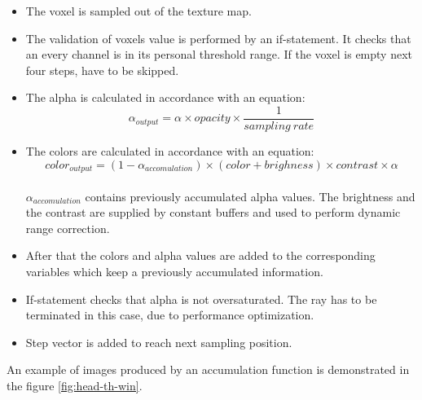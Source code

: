 \documentclass[twoside, english, 11pt]{report}
\begin{document}
\begin{itemize}
\item The voxel is sampled out of the texture map.
\item The validation of voxels value is performed by an if-statement. It checks that an every channel is in its personal threshold range. If the voxel is empty next four steps, have to be skipped.
\item The alpha is calculated in accordance with an equation:
\begin{equation} \label{eq:alpha}
\alpha_{output} = \alpha \times opacity \times \frac {1}{{sampling\ rate}}
\end{equation}
\item The colors are calculated in accordance with an equation:
\begin{equation} \label{eq:color}
color_{output} = (1 - \alpha_{accomulation}) \times (color + brighness) \times contrast  \times \alpha
\end{equation}\\

$\alpha_{accomulation}$ contains previously accumulated alpha values. The brightness and the contrast are supplied by constant buffers and used to perform dynamic range correction.
\item After that the colors and alpha values are added to the corresponding variables which keep a previously accumulated information.
\item If-statement checks that alpha is not oversaturated. The ray has to be terminated in this case, due to performance optimization.
\item Step vector is added to reach next sampling position.
\end{itemize}

An example of images produced by an accumulation function is demonstrated in the figure \ref{fig:head-th-win}. \\
\end{document}

